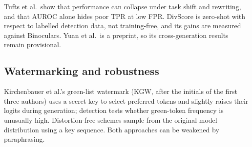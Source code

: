 \documentclass[11pt]{article}
\begin{document}
Tufts et al.\ show that performance can collapse under task shift and rewriting, and that AUROC alone hides poor TPR at low FPR. DivScore is zero-shot with respect to labelled detection data, not training-free, and its gains are measured against Binoculars. Yuan et al.\ is a preprint, so its cross-generation results remain provisional.

\subsection{Watermarking and robustness}
Kirchenbauer et al.'s green-list watermark (KGW, after the initials of the first three authors) uses a secret key to select preferred tokens and slightly raises their logits during generation; detection tests whether green-token frequency is unusually high. Distortion-free schemes sample from the original model distribution using a key sequence. Both approaches can be weakened by paraphrasing.
\end{document}

